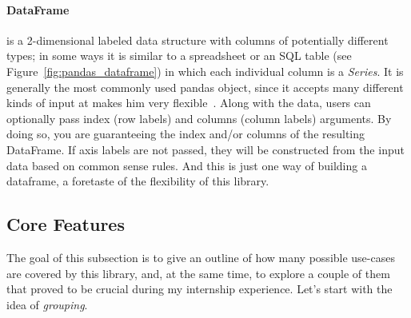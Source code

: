 \paragraph{DataFrame} is a 2-dimensional labeled data structure with columns of potentially different types; in some ways it is
similar to
a spreadsheet or an SQL table (see Figure~\ref{fig:pandas_dataframe}) in which each individual column is a \textit{Series}.
It is generally the most commonly used pandas object, since it accepts many different kinds of input  at makes him very flexible~\cite{reback_pandas-dev/pandas:_2022}.
Along with the data,
users
%
can optionally pass index (row labels) and columns (column labels) arguments. By doing so,  you are guaranteeing the index and/or columns of the resulting DataFrame.
If axis labels are not passed, they will be constructed from the input data based on common sense rules.
And this is just one way of building a dataframe, a foretaste of the flexibility of this library.

\subsection{Core Features}
The
goal
%
of this subsection is to give an outline of how many possible use-cases are covered by this library, and, at the same time, to explore a couple of them that proved to be crucial during my internship experience.
Let's start with the idea of \textit{grouping}.


